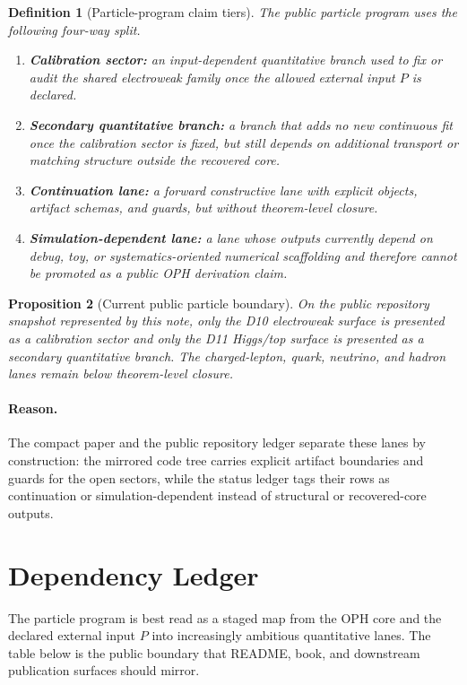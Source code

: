 \documentclass[11pt]{article}
\newtheorem{proposition}{Proposition}[section]
\newtheorem{definition}[proposition]{Definition}
\begin{document}
\begin{definition}[Particle-program claim tiers]
The public particle program uses the following four-way split.
\begin{enumerate}[leftmargin=2em]
\item \textbf{Calibration sector:} an input-dependent quantitative branch used to
fix or audit the shared electroweak family once the allowed external input
\(P\) is declared.
\item \textbf{Secondary quantitative branch:} a branch that adds no new
continuous fit once the calibration sector is fixed, but still depends on
additional transport or matching structure outside the recovered core.
\item \textbf{Continuation lane:} a forward constructive lane with explicit
objects, artifact schemas, and guards, but without theorem-level closure.
\item \textbf{Simulation-dependent lane:} a lane whose outputs currently depend
on debug, toy, or systematics-oriented numerical scaffolding and therefore
cannot be promoted as a public OPH derivation claim.
\end{enumerate}
\end{definition}

\begin{proposition}[Current public particle boundary]
On the public repository snapshot represented by this note, only the D10
electroweak surface is
presented as a calibration sector and only the D11 Higgs/top surface is
presented as a secondary quantitative branch. The charged-lepton, quark,
neutrino, and hadron lanes remain below theorem-level closure.
\end{proposition}

\paragraph{Reason.}
The compact paper and the public repository ledger separate these lanes by
construction: the mirrored code tree carries explicit artifact boundaries and
guards for the open sectors, while the status ledger tags their rows as
continuation or simulation-dependent instead of structural or recovered-core
outputs.

\section{Dependency Ledger}

The particle program is best read as a staged map from the OPH core and
the declared external input \(P\) into increasingly ambitious quantitative
lanes. The table below is the public boundary that README, book, and downstream
publication surfaces should mirror.
\end{document}
